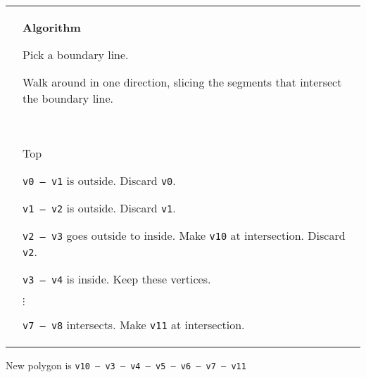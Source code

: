 \begin{tabular}{m{75mm}m{85mm}}
\begin{tikzpicture}[x=1.5mm,y=1.5mm]
\end{tikzpicture}
&
{\bf Algorithm}

Pick a boundary line.

Walk around in one direction, slicing the segments that intersect the boundary line.  

\

Top

{\tt v0 -- v1} is outside. Discard {\tt v0}.

{\tt v1 -- v2} is outside. Discard {\tt v1}.  

{\tt v2 -- v3} goes outside to inside. Make {\tt v10} at intersection.  Discard {\tt v2}.  

{\tt v3 -- v4} is inside.   Keep these vertices.  

$\vdots$

{\tt v7 -- v8} intersects.  Make {\tt v11} at intersection.  

\end{tabular}

New polygon is {\tt v10 -- v3 -- v4 -- v5 -- v6 -- v7 -- v11}

